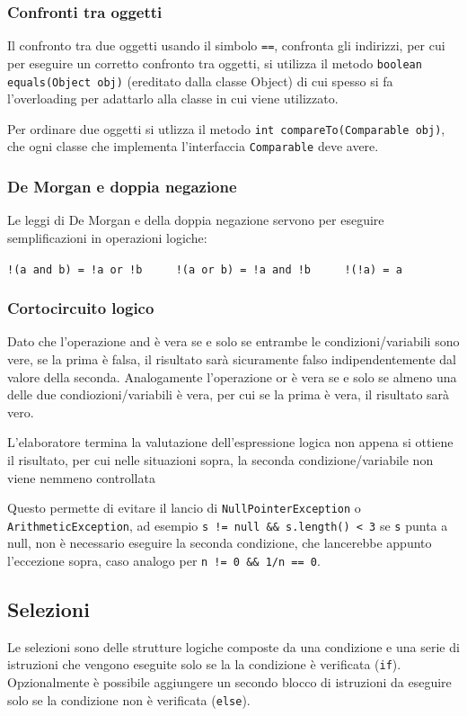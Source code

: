 \documentclass[a4paper]{article}
\begin{document}
\subsubsection*{Confronti tra oggetti}
Il confronto tra due oggetti usando il simbolo \verb|==|, confronta gli indirizzi, per cui per eseguire un corretto confronto tra
oggetti, si utilizza il metodo \verb|boolean equals(Object obj)| (ereditato dalla classe Object) di cui spesso si fa l'overloading
per adattarlo alla classe in cui viene utilizzato.

Per ordinare due oggetti si utlizza il metodo \verb|int compareTo(Comparable obj)|, che ogni classe che implementa l'interfaccia
\verb|Comparable| deve avere.

\subsubsection*{De Morgan e doppia negazione}
Le leggi di De Morgan e della doppia negazione servono per eseguire semplificazioni in operazioni logiche:
\begin{center}
	\verb|!(a and b) = !a or !b| \(\qquad\) \verb|!(a or b) = !a and !b| \(\qquad\) \verb|!(!a) = a|
\end{center}

\subsubsection*{Cortocircuito logico}
Dato che l'operazione and è vera se e solo se entrambe le condizioni/variabili sono vere, se la prima è falsa, il risultato sarà
sicuramente falso indipendentemente dal valore della seconda. Analogamente l'operazione or è vera se e solo se almeno una delle
due condiozioni/variabili è vera, per cui se la prima è vera, il risultato sarà vero.

L'elaboratore termina la valutazione dell'espressione logica non appena si ottiene il risultato, per cui nelle situazioni sopra,
la seconda condizione/variabile non viene nemmeno controllata

Questo permette di evitare il lancio di \verb|NullPointerException| o \verb|ArithmeticException|, ad esempio \verb|s != null && s.length() < 3|
se \verb|s| punta a null, non è necessario eseguire la seconda condizione, che lancerebbe appunto l'eccezione sopra, caso analogo per \verb|n != 0 && 1/n == 0|.

\newpage


\subsection{Selezioni}
Le selezioni sono delle strutture logiche composte da una condizione e una serie di istruzioni che vengono eseguite solo se la
la condizione è verificata (\verb|if|). Opzionalmente è possibile aggiungere un secondo blocco di istruzioni da eseguire solo
se la condizione non è verificata (\verb|else|).
\end{document}
